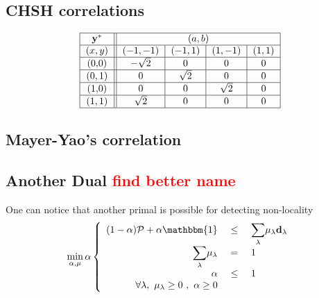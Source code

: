 \subsection{CHSH correlations}





\begin{equation*}
    \begin{tabular}{|c||*{4}{c|}}\hline
  $\mathbf{y^*}$   & \multicolumn{4}{ c| }{$(a,b)$} \\
  \hline
$(x,y)$&$(-1,-1)$&$(-1,1)$&$(1,-1)$&$(1,1)$\\
\hline
$($0$,$0$)$&$-\sqrt{2}$&$0$&$0$&$0$\\
\hline
$($0$,1)$&$0$&$\sqrt{2}$&$0$&$0$\\
\hline
$(1,$0$)$&$0$&$0$&$\sqrt{2}$&$0$\\
\hline
$(1,1)$&$\sqrt{2}$&$0$&$0$&$0$\\
\hline
    \end{tabular}
\end{equation*}



\subsection{Mayer-Yao's correlation}





\subsection{Another Dual \textcolor{red}{find better name}}

One can notice that another primal is possible for detecting non-locality 
\begin{equation}
    \displaystyle{\min_{\alpha,\mathbf{\mu}}} \, \alpha  \\

\left\{
\begin{array}{rcl}
 (1-\alpha) \mathcal{P}+ \alpha \mathbbm{1} &\ \leq \ & \displaystyle{\sum_\lambda} \mu_\lambda \mathbf{d_\lambda} \\
\displaystyle{\sum_\lambda} \mu_\lambda &\ = \ & 1  \\
\alpha  &\ \leq \ & 1 \\
\forall \lambda,\ \mu_\lambda \geq 0\ ,\ \alpha \geq 0  
\end{array}
\right.
\label{eq:primal2}
\end{equation}

